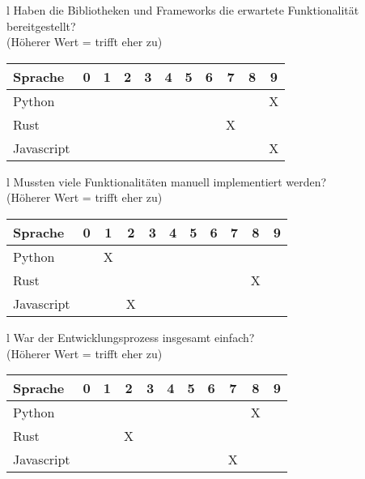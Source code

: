 \begin{tabular}{l}
	Haben die Bibliotheken und Frameworks die erwartete Funktionalität bereitgestellt? \\
	(Höherer Wert = trifft eher zu)                                                    \\
	\begin{tabular}{| l | c | c | c | c | c | c | c | c | c | c |}
		\hline
		Sprache    & 0 & 1 & 2 & 3 & 4 & 5 & 6 & 7 & 8 & 9 \\
		\hline
		Python     &   &   &   &   &   &   &   &   &   & X \\
		\hline
		Rust       &   &   &   &   &   &   &   & X &   &   \\
		\hline
		Javascript &   &   &   &   &   &   &   &   &   & X \\
		\hline
	\end{tabular}
\end{tabular}

\begin{tabular}{l}
	Mussten viele Funktionalitäten manuell implementiert werden? \\
	(Höherer Wert = trifft eher zu)                              \\
	\begin{tabular}{| l | c | c | c | c | c | c | c | c | c | c |}
		\hline
		Sprache    & 0 & 1 & 2 & 3 & 4 & 5 & 6 & 7 & 8 & 9 \\
		\hline
		Python     &   & X &   &   &   &   &   &   &   &   \\
		\hline
		Rust       &   &   &   &   &   &   &   &   & X &   \\
		\hline
		Javascript &   &   & X &   &   &   &   &   &   &   \\
		\hline
	\end{tabular}
\end{tabular}

\begin{tabular}{l}
	War der Entwicklungsprozess insgesamt einfach? \\
	(Höherer Wert = trifft eher zu)                \\
	\begin{tabular}{| l | c | c | c | c | c | c | c | c | c | c |}
		\hline
		Sprache    & 0 & 1 & 2 & 3 & 4 & 5 & 6 & 7 & 8 & 9 \\
		\hline
		Python     &   &   &   &   &   &   &   &   & X &   \\
		\hline
		Rust       &   &   & X &   &   &   &   &   &   &   \\
		\hline
		Javascript &   &   &   &   &   &   &   & X &   &   \\
		\hline
	\end{tabular}
\end{tabular}


